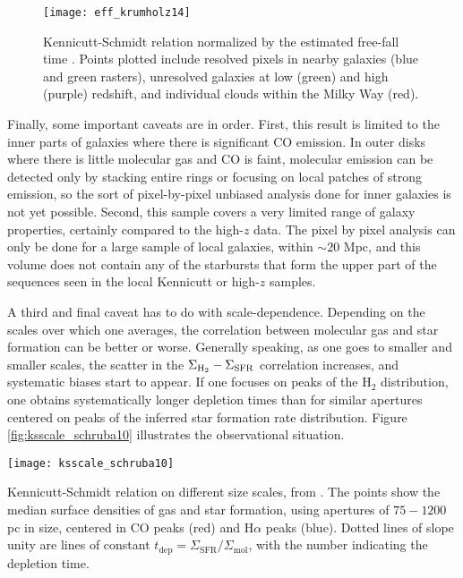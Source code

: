 \begin{figure}
\texttt{[image: eff\_krumholz14]}
\caption[Kennicutt-Schmidt relation normalized by the free-fall time]{
\label{fig:ks_krumholz14}
Kennicutt-Schmidt relation normalized by the estimated free-fall time \citet{krumholz14c}. Points plotted include resolved pixels in nearby galaxies (blue and green rasters), unresolved galaxies at low (green) and high (purple) redshift, and individual clouds within the Milky Way (red).
}
\end{figure}

Finally, some important caveats are in order. First, this result is limited to the inner parts of galaxies where there is significant CO emission. In outer disks where there is little molecular gas and CO is faint, molecular emission can be detected only by stacking entire rings or focusing on local patches of strong emission, so the sort of pixel-by-pixel unbiased analysis done for inner galaxies is not yet possible. Second, this sample covers a very limited range of galaxy properties, certainly compared to the high-$z$ data. The pixel by pixel analysis can only be done for a large sample of local galaxies, within $\sim 20$ Mpc, and this volume does not contain any of the starbursts that form the upper part of the sequences seen in the local Kennicutt or high-$z$ samples.

A third and final caveat has to do with scale-dependence. Depending on the scales over which one averages, the correlation between molecular gas and star formation can be better or worse. Generally speaking, as one goes to smaller and smaller scales, the scatter in the $\Sigma_{\rm H_2} - \Sigma_{\rm SFR}$ correlation increases, and systematic biases start to appear. If one focuses on peaks of the H$_2$ distribution, one obtains systematically longer depletion times than for similar apertures centered on peaks of the inferred star formation rate distribution. Figure \ref{fig:ksscale_schruba10} illustrates the observational situation.
\begin{marginfigure}
\texttt{[image: ksscale\_schruba10]}
\caption[Kennicutt-Schmidt relation averaged on different size scales in M33]{
\label{fig:ksscale_schruba10}
Kennicutt-Schmidt relation on different size scales, from \citet{schruba10a}. The points show the median surface densities of gas and star formation, using apertures of $75-1200$ pc in size, centered in CO peaks (red) and H$\alpha$ peaks (blue). Dotted lines of slope unity are lines of constant $t_{\mathrm{dep}} = \Sigma_{\mathrm{SFR}} / \Sigma_{\mathrm{mol}}$, with the number indicating the depletion time.
}
\end{marginfigure}

